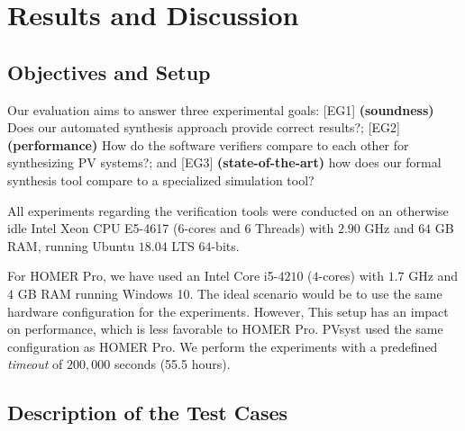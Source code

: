 \documentclass[10pt,journal,compsoc]{IEEEtran}
\begin{document}
\section{Results and Discussion}

\subsection{Objectives and Setup}
\label{ObjectivesAndSetup}

Our evaluation aims to answer three experimental goals: [EG1] \textbf{(soundness)} Does our automated synthesis approach provide correct results?; [EG2] \textbf{(performance)} How do the software verifiers compare to each other for synthesizing PV systems?; and [EG3] \textbf{(state-of-the-art)} how does our formal synthesis tool compare to a specialized simulation tool?

\color{blue}All experiments regarding the verification tools were conducted on an otherwise idle Intel Xeon CPU E5-4617 ($6$-cores and 6 Threads) with $2.90$ GHz and $64$ GB RAM, running Ubuntu $18.04$ LTS $64$-bits. 

For HOMER Pro, we have used an Intel Core i5-$4210$ ($4$-cores) with $1.7$ GHz and $4$ GB RAM running Windows 10. The ideal scenario would be to use the same hardware configuration for the experiments. However, This setup has an impact on performance, which is less favorable to HOMER Pro. PVsyst used the same configuration as HOMER Pro. We perform the experiments with a predefined \textit{timeout} of $200,000$ seconds (55.5 hours).\color{black}

\subsection{Description of the Test Cases}
\end{document}
